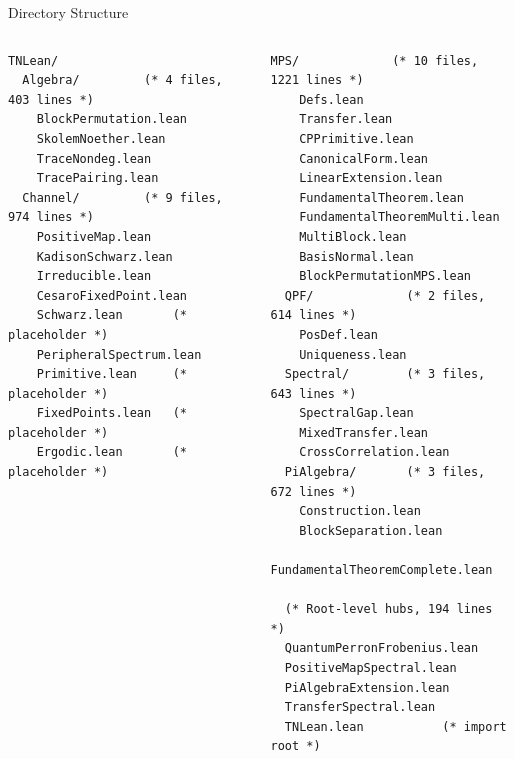 \documentclass[aspectratio=169,10pt]{beamer}
\begin{document}
\begin{frame}[fragile]{Directory Structure}
    \vspace{-0.3em}
    \begin{columns}[T]
        \begin{lstlisting}[basicstyle=\ttfamily\tiny\color{white},frame=none,backgroundcolor=\color{cardbg}]
TNLean/
  Algebra/         (* 4 files, 403 lines *)
    BlockPermutation.lean
    SkolemNoether.lean
    TraceNondeg.lean
    TracePairing.lean
  Channel/         (* 9 files, 974 lines *)
    PositiveMap.lean
    KadisonSchwarz.lean
    Irreducible.lean
    CesaroFixedPoint.lean
    Schwarz.lean       (* placeholder *)
    PeripheralSpectrum.lean
    Primitive.lean     (* placeholder *)
    FixedPoints.lean   (* placeholder *)
    Ergodic.lean       (* placeholder *)
        \end{lstlisting}

        \begin{lstlisting}[basicstyle=\ttfamily\tiny\color{white},frame=none,backgroundcolor=\color{cardbg}]
  MPS/             (* 10 files, 1221 lines *)
    Defs.lean
    Transfer.lean
    CPPrimitive.lean
    CanonicalForm.lean
    LinearExtension.lean
    FundamentalTheorem.lean
    FundamentalTheoremMulti.lean
    MultiBlock.lean
    BasisNormal.lean
    BlockPermutationMPS.lean
  QPF/             (* 2 files, 614 lines *)
    PosDef.lean
    Uniqueness.lean
  Spectral/        (* 3 files, 643 lines *)
    SpectralGap.lean
    MixedTransfer.lean
    CrossCorrelation.lean
  PiAlgebra/       (* 3 files, 672 lines *)
    Construction.lean
    BlockSeparation.lean
    FundamentalTheoremComplete.lean

  (* Root-level hubs, 194 lines *)
  QuantumPerronFrobenius.lean
  PositiveMapSpectral.lean
  PiAlgebraExtension.lean
  TransferSpectral.lean
  TNLean.lean           (* import root *)
        \end{lstlisting}
    \end{columns}
\end{frame}
\end{document}
